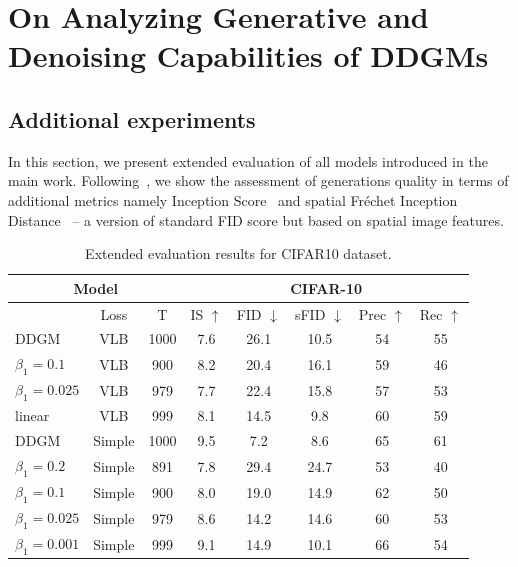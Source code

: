 \newpage

\chapter{On Analyzing Generative and Denoising Capabilities of DDGMs}
\newpage
\section{Additional experiments} \label{appendix:extra_results}

In this section, we present extended evaluation of all models introduced in the main work. Following~\cite{nichol2021improved}, we show the assessment of generations quality in terms of additional metrics namely Inception Score~\cite{salimans2016improved} and spatial Fréchet Inception Distance~\cite{nash2021generating} -- a version of standard FID score but based on spatial image features.

\begin{table}[h!]
  \centering
  \caption{Extended evaluation results for CIFAR10 dataset.
}
  \label{tab:extended_results_cifar}
  \begin{tabular}{l|c|c||ccccc}
    \toprule
     \multicolumn{3}{c||}{Model} &  \multicolumn{5}{c}{CIFAR-10}\\
    \midrule
     &Loss& T &IS  $\uparrow$&FID $\downarrow$& sFID $\downarrow$&Prec $\uparrow$&Rec $\uparrow$\\

    \midrule
    DDGM & VLB& 1000  & 7.6&26.1&10.5&54&55\\
    \ours{} $\beta_1=0.1$ & VLB &900  & 8.2&20.4&16.1&59&46\\
    \ours{} $\beta_1=0.025$ & VLB &979  & 7.7&22.4&15.8&57&53\\
    \ours{} linear &VLB& 999  & 8.1&14.5&9.8&60&59 \\
    \midrule
    DDGM & Simple & 1000  & 9.5&7.2&8.6&65&61\\
    \ours{} $\beta_1=0.2$& Simple &891 & 7.8&29.4&24.7&53&40 \\
    \ours{} $\beta_1=0.1$& Simple &900 & 8.0&19.0&14.9&62&50 \\
    \ours{} $\beta_1=0.025$& Simple &979 & 8.6&14.2&14.6&60&53 \\
    \ours{} $\beta_1=0.001$ &Simple &999 & 9.1&14.9&10.1&66&54 \\
    \bottomrule
  \end{tabular}
\vspace*{2\baselineskip}
\end{table}


